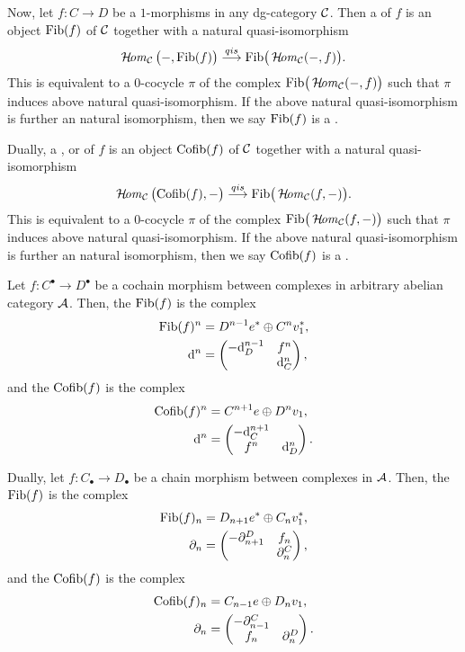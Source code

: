 {Now, let $f\colon C\to D$ be 
a $1$-morphisms in 
any dg-category ${\cal C}$. 
Then a  of $f$  
is an object $\mathrm{Fib}(f)$ of ${\cal C}$ together with a natural quasi-isomorphism 
\[
\operatorname{\mathcal{H}\!\mathit{om}}_{{\cal C}}\big(-,\mathrm{Fib}(f)\big)\stackrel{{qis}}{\longrightarrow} 
\mathrm{Fib}\big(\operatorname{\mathcal{H}\!\mathit{om}}_{{\cal C}}(-,f)\big).
\]
This is equivalent to a $0$-cocycle $\pi$ of the complex
$\mathrm{Fib}\big(\operatorname{\mathcal{H}\!\mathit{om}}_{{\cal C}}(-,f)\big)$
such that $\pi$ induces above 
natural quasi-isomorphism. 
If the above natural quasi-isomorphism 
is further an natural isomorphism, 
then we say $\mathrm{Fib}(f)$ is 
a . 

Dually, a , 
or  of $f$ 
is an object $\mathrm{Cofib}(f)$ of ${\cal C}$ together with a natural quasi-isomorphism 
\[
\operatorname{\mathcal{H}\!\mathit{om}}_{{\cal C}}\big(\mathrm{Cofib}(f),-\big)\stackrel{{qis}}{\longrightarrow} 
\mathrm{Fib}\big(\operatorname{\mathcal{H}\!\mathit{om}}_{{\cal C}}(f,-)\big).
\]
This is equivalent to a $0$-cocycle $\pi$ of the complex
$\mathrm{Fib}\big(\operatorname{\mathcal{H}\!\mathit{om}}_{{\cal C}}(f,-)\big)$ 
such that $\pi$ induces above 
natural quasi-isomorphism. 
If the above natural quasi-isomorphism 
is further an natural isomorphism, 
then we say $\mathrm{Cofib}(f)$ is 
a .

Let $f\colon C^{\bullet}\to D^{\bullet}$ 
be a cochain morphism between complexes 
in arbitrary abelian category ${\cal A}$. 
Then, the  $\mathrm{Fib}(f)$ 
is the complex 
\begin{align*}
\mathrm{Fib}(f)^n &= 
D^{n-1}e^{\ast}\oplus C^nv_1^{\ast}, \\
\mathrm{d}^n &= 
\begin{pmatrix}
-\mathrm{d}_D^{n-1} & f^n \\
 & \mathrm{d}_C^n
\end{pmatrix},
\end{align*}
and the  $\mathrm{Cofib}(f)$ 
is the complex 
\begin{align*}
\mathrm{Cofib}(f)^n &= 
C^{n+1}e\oplus D^nv_1, \\
\mathrm{d}^n &= 
\begin{pmatrix}
-\mathrm{d}_C^{n+1} & \\
f^n & \mathrm{d}_D^n
\end{pmatrix}.
\end{align*}

Dually, let $f\colon C_{\bullet}\to D_{\bullet}$ 
be a chain morphism between complexes in ${\cal A}$. 
Then, the  $\mathrm{Fib}(f)$ 
is the complex 
\begin{align*}
\mathrm{Fib}(f)_n &= 
D_{n+1}e^{\ast}\oplus C_nv_1^{\ast}, \\
\partial_n &= 
\begin{pmatrix}
-\partial^D_{n+1} & f_n \\
 & \partial^C_n
\end{pmatrix},
\end{align*}
and the  $\mathrm{Cofib}(f)$ 
is the complex 
\begin{align*}
\mathrm{Cofib}(f)_n &= 
C_{n-1}e\oplus D_nv_1, \\
\partial_n &= 
\begin{pmatrix}
-\partial^C_{n-1} & \\
f_n & \partial^D_n
\end{pmatrix}.
\end{align*}

}

